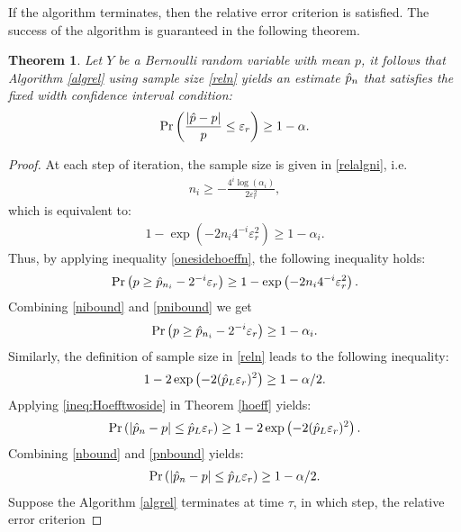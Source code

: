 \documentclass{iitthesis}
\newtheorem{theorem}{Theorem}[section]
\theoremstyle{definition}
\begin{document}
If the algorithm terminates, then the relative error criterion is satisfied. The success of the algorithm is guaranteed in the following theorem.
\begin{theorem}
Let $Y$ be a Bernoulli random variable with mean $p$, it follows that Algorithm \ref{algrel} using sample size \eqref{reln} yields an estimate $\hat{p}_n$ that satisfies the fixed width confidence interval condition:
\begin{align}\label{probrel}
\Pr\left(\frac{\left \lvert \hat{p} -p \right \rvert}{p} \leq \varepsilon_r \right) \geq 1-\alpha.
\end{align}
\end{theorem}
\begin{proof}
At each step of iteration, the sample size is given in \eqref{relalgni}, i.e.
\begin{align*}
n_i \geq -\frac{4^i \log(\alpha_i)} {2\varepsilon_r^2 },
 \end{align*}
 which is equivalent to:
\begin{align}\label{nibound}
1- \exp\left(-2n_i4^{-i}\varepsilon_r^2\right) \geq 1-\alpha_i.
\end{align}
 Thus, by applying inequality \eqref{onesidehoeffn}, the following inequality holds:
 \begin{align} \label{pnibound}
\Pr\left(p \geq \hat{p}_{n_i}-2^{-i}\varepsilon_r  \right) \geq 1- \exp\left(-2n_i4^{-i}\varepsilon_r^2\right).
 \end{align} 
Combining \eqref{nibound} and \eqref{pnibound} we get
 \begin{align} \label{lbpni}
 \Pr\left(p \geq \hat{p}_{n_i}-2^{-i}\varepsilon_r \right) \geq 1-\alpha_i.
 \end{align}
Similarly, the definition of sample size in \eqref{reln} leads to the following inequality:
\begin{align}\label{nbound}
1-2\exp\left(-2 (\hat{p}_L\varepsilon_{r})^2\right) \geq 1-\alpha/2.
\end{align}
Applying \eqref{ineq:Hoefftwoside} in Theorem \ref{hoeff} yields:
\begin{align}\label{pnbound}
 \Pr\left( \left|{\hat{p}_n - p}\right| \leq \hat{p}_L \varepsilon_r \right ) \geq  1-2\exp\left(-2  (\hat{p}_L\varepsilon_{r})^2\right).
 \end{align}
Combining \eqref{nbound} and \eqref{pnbound} yields:
 \begin{align}\label{lbpn}
  \Pr \left(\left \lvert \hat{p}_n - p \right \rvert \leq \hat{p}_L \varepsilon_r \right ) \geq 1-\alpha/2.
 \end{align}
Suppose the Algorithm \ref{algrel} terminates at time $\tau$, in which step, the relative error criterion 

\end{proof}
\end{document}
